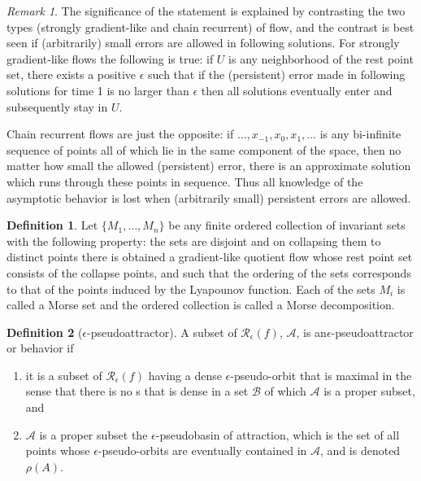 \documentclass{scrartcl}
\theoremstyle{definition}
\newtheorem{definition}{Definition}
\theoremstyle{remark}
\newtheorem{remark}{Remark}
\begin{document}
\begin{remark}\label{rem:error_noise}
The significance of the statement is explained by contrasting the two types (strongly gradient-like and chain recurrent) of flow, and the contrast is best seen if (arbitrarily) small errors are allowed in following solutions. For strongly gradient-like flows the following is true: if $U$ is any neighborhood of the rest point set, there exists a positive $\epsilon$ such that if the (persistent) error made in following solutions for time 1 is no larger than $\epsilon$ then all solutions eventually enter and subsequently stay in $U$.

Chain recurrent flows are just the opposite: if $\dots,x_{-1},x_0, x_{1},\dots$ is any bi-infinite sequence of points all of which lie in the same component of the space, then no matter how small the allowed (persistent) error, there is an approximate solution which runs through these points in sequence. Thus all knowledge of the asymptotic behavior is lost when (arbitrarily small) persistent errors are allowed.
\end{remark}

\begin{definition}
Let $\{M_1, \dots, M_n\}$ be any finite ordered collection of invariant sets with the following property: the sets are disjoint and on collapsing them to distinct points there is obtained a gradient-like quotient flow whose rest point set consists of the collapse points, and such that the ordering of the sets corresponds to that of the points induced by the Lyapounov function.
 Each of the sets $M_i$ is called a Morse set and the ordered collection is called a Morse decomposition.
\end{definition}

\begin{definition}[$\epsilon$-pseudoattractor]
A subset of $\mathcal{R}_\epsilon(f)$, $\mathcal{A}$, is an$\epsilon$-pseudoattractor or behavior if
\begin{enumerate}
\item  it is a subset of $\mathcal{R}_\epsilon(f)$ having a dense $\epsilon$-pseudo-orbit that is maximal in the sense that there is no s that is dense in a set  $\mathcal{B}$ of which  $\mathcal{A}$ is a proper subset, and
\item  $\mathcal{A}$ is a proper subset the $\epsilon$-pseudobasin of attraction, which is the set of all points whose $\epsilon$-pseudo-orbits are eventually contained in  $\mathcal{A}$, and is denoted $\rho(A)$.
\end{enumerate}
\end{definition}
\end{document}

